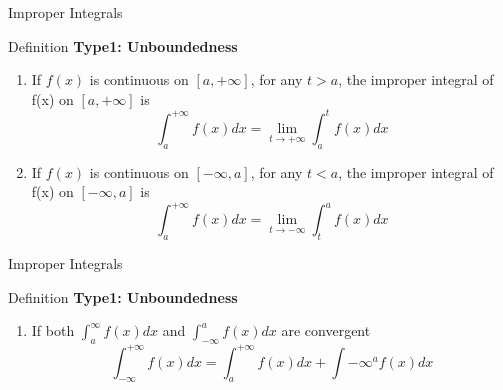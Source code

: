 \begin{frame}{Improper Integrals}
    \begin{block}{Definition}
        \textbf{Type1: Unboundedness}
        \begin{enumerate}

            \item If $f(x)$ is continuous on $[a,+\infty]$, for any $t>a$, the improper integral of f(x) on $[a,+\infty]$ is
                  \begin{equation*}
                      \int_a^{+\infty} f(x)dx = \lim_{t\rightarrow +\infty}\int_{a}^{t}f(x)dx
                  \end{equation*}

            \item If $f(x)$ is continuous on $[-\infty, a]$, for any $t<a$, the improper integral of f(x) on $[-\infty, a]$ is
                  \begin{equation*}
                      \int_a^{+\infty} f(x)dx = \lim_{t\rightarrow -\infty}\int_{t}^{a}f(x)dx
                  \end{equation*}



        \end{enumerate}
    \end{block}
\end{frame}

\begin{frame}{Improper Integrals}
    \begin{block}{Definition}
        \textbf{Type1: Unboundedness}
        \begin{enumerate}[3]
            \item If both $\int_a^{\infty}f(x)dx$ and $\int_{-\infty}^{a}f(x)dx$ are convergent
                  \begin{equation*}
                      \int_{-\infty}^{+\infty} f(x)dx = \int_a^{+\infty} f(x)dx + \int{-\infty}^{a} f(x)dx
                  \end{equation*}

        \end{enumerate}
    \end{block}
\end{frame}

